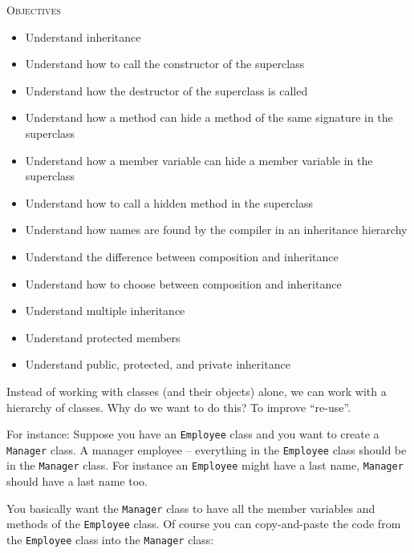 \newpage{}

\textsc{Objectives}

\begin{itemize}
\item
  Understand inheritance
\item
  Understand how to call the constructor of the superclass
\item
  Understand how the destructor of the superclass is called
\item
  Understand how a method can hide a method of the same signature in the
  superclass
\item
  Understand how a member variable can hide a member variable in the
  superclass
\item
  Understand how to call a hidden method in the superclass
\item
  Understand how names are found by the compiler in an inheritance
  hierarchy
\item
  Understand the difference between composition and inheritance
\item
  Understand how to choose between composition and inheritance
\item
  Understand multiple inheritance
\item
  Understand protected members
\item
  Understand public, protected, and private inheritance
\end{itemize}

\newpage{}

Instead of working with classes (and their objects) alone, we can work
with a hierarchy of classes. Why do we want to do this? To improve
``re-use''.

For instance: Suppose you have an \texttt{Employee} class and you want to create a \texttt{Manager} class. A manager  employee -- everything in the \texttt{Employee} class should be in the \texttt{Manager} class. For instance an \texttt{Employee} might have a last name, \texttt{Manager} should have a last name too.

You basically want the \texttt{Manager} class to have all the member variables and methods of the \texttt{Employee} class. Of course you can copy-and-paste the code from the \texttt{Employee} class into the \texttt{Manager} class:

